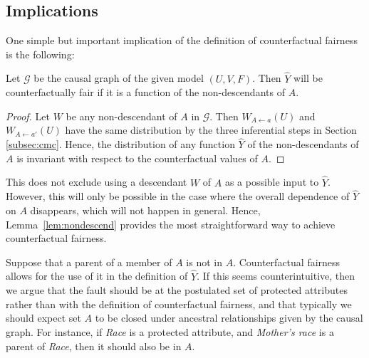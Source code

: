 \subsection{Implications}
%
One simple but important implication of the definition of counterfactual fairness is the following:
%
\begin{lem}
  \label{lem:nondescend}
  Let $\mathcal G$ be the causal graph of the given model $(U, V, F)$.
  Then $\hat Y$ will be counterfactually fair if it is a function
  of the non-descendants of $A$.
\end{lem}
%
\begin{proof}
 Let $W$ be any non-descendant of $A$ in $\mathcal G$. Then $W_{A
   \leftarrow a}(U)$ and $W_{A \leftarrow a'}(U)$ have the same
 distribution by the three inferential steps in Section
 \ref{subsec:cmc}.  Hence, the distribution of any function $\hat Y$ of the non-descendants of $A$
 is invariant with respect to the counterfactual values of $A$.
\end{proof}

This does not exclude using a descendant $W$ of $A$ as a possible input to
$\hat Y$. However, this will only be possible in the case where the
overall dependence of $\hat Y$ on $A$ disappears, which will not
happen in general. Hence, Lemma~\ref{lem:nondescend} provides the most
straightforward way to achieve counterfactual fairness.

 Suppose that
a parent of a member of $A$ is not in $A$.  Counterfactual fairness
allows for the use of it in the definition of $\hat Y$. If this seems
counterintuitive, then we argue that the fault should be at the
postulated set of protected attributes rather than with the definition
of counterfactual fairness, and that typically we should expect set
$A$ to be closed under ancestral relationships given by the causal
graph. For instance, if {\it Race} is a protected attribute, and {\it
  Mother's race} is a parent of {\it Race}, then it should also be in
$A$.

